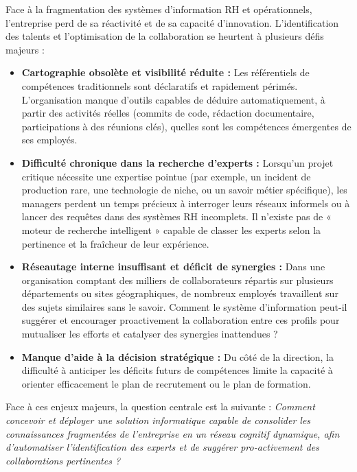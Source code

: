 \documentclass[12pt,a4paper]{article}
\begin{document}
Face à la fragmentation des systèmes d'information RH et opérationnels, l’entreprise perd de sa réactivité et de sa capacité d'innovation. L'identification des talents et l'optimisation de la collaboration se heurtent à plusieurs défis majeurs :

\begin{itemize}[leftmargin=*]
    \item \textbf{Cartographie obsolète et visibilité réduite :} Les référentiels de compétences traditionnels sont déclaratifs et rapidement périmés. L'organisation manque d'outils capables de déduire automatiquement, à partir des activités réelles (commits de code, rédaction documentaire, participations à des réunions clés), quelles sont les compétences émergentes de ses employés.
    \item \textbf{Difficulté chronique dans la recherche d'experts :} Lorsqu'un projet critique nécessite une expertise pointue (par exemple, un incident de production rare, une technologie de niche, ou un savoir métier spécifique), les managers perdent un temps précieux à interroger leurs réseaux informels ou à lancer des requêtes dans des systèmes RH incomplets. Il n'existe pas de « moteur de recherche intelligent » capable de classer les experts selon la pertinence et la fraîcheur de leur expérience.
    \item \textbf{Réseautage interne insuffisant et déficit de synergies :} Dans une organisation comptant des milliers de collaborateurs répartis sur plusieurs départements ou sites géographiques, de nombreux employés travaillent sur des sujets similaires sans le savoir. Comment le système d'information peut-il suggérer et encourager proactivement la collaboration entre ces profils pour mutualiser les efforts et catalyser des synergies inattendues ?
    \item \textbf{Manque d'aide à la décision stratégique :} Du côté de la direction, la difficulté à anticiper les déficits futurs de compétences limite la capacité à orienter efficacement le plan de recrutement ou le plan de formation.
\end{itemize}

Face à ces enjeux majeurs, la question centrale est la suivante : \textit{Comment concevoir et déployer une solution informatique capable de consolider les connaissances fragmentées de l'entreprise en un réseau cognitif dynamique, afin d'automatiser l'identification des experts et de suggérer pro-activement des collaborations pertinentes ?}
\end{document}
